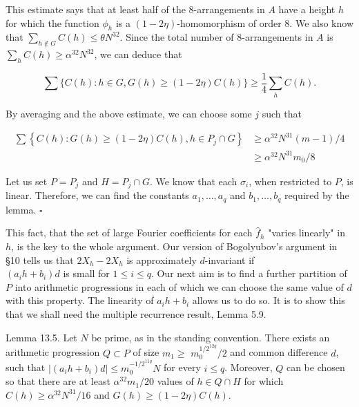 \documentclass[10pt]{article}
\begin{document}
This estimate says that at least half of the 8-arrangements in $A$ have a height $h$ for which the function $\phi_{h}$ is a $(1-2 \eta)$-homomorphism of order 8. We also know that $\sum_{h \notin G} C(h) \leqslant \theta N^{32}$. Since the total number of 8-arrangements in $A$ is $\sum_{h} C(h) \geqslant \alpha^{32} N^{32}$, we can deduce that

$$
\sum\{C(h): h \in G, G(h) \geqslant(1-2 \eta) C(h)\} \geqslant \frac{1}{4} \sum_{h} C(h) .
$$

By averaging and the above estimate, we can choose some $j$ such that

$$
\begin{aligned}
\sum\left\{C(h): G(h) \geqslant(1-2 \eta) C(h), h \in P_{j} \cap G\right\} & \geqslant \alpha^{32} N^{31}(m-1) / 4 \\
& \geqslant \alpha^{32} N^{31} m_{0} / 8
\end{aligned}
$$

Let us set $P=P_{j}$ and $H=P_{j} \cap G$. We know that each $\sigma_{i}$, when restricted to $P$, is linear. Therefore, we can find the constants $a_{1}, \ldots, a_{q}$ and $b_{1}, \ldots, b_{q}$ required by the lemma. \(\square\)

This fact, that the set of large Fourier coefficients for each $\hat{f}_{h}$ "varies linearly" in $h$, is the key to the whole argument. Our version of Bogolyubov's argument in §10 tells us that $2 X_{h}-2 X_{h}$ is approximately $d$-invariant if\\
$\left(a_{i} h+b_{i}\right) d$ is small for $1 \leqslant i \leqslant q$. Our next aim is to find a further partition of $P$ into arithmetic progressions in each of which we can choose the same value of $d$ with this property. The linearity of $a_{i} h+b_{i}$ allows us to do so. It is to show this that we shall need the multiple recurrence result, Lemma 5.9.

Lemma 13.5. Let $N$ be prime, as in the standing convention. There exists an arithmetic progression $Q \subset P$ of size $m_{1} \geqslant$ $m_{0}^{1 / 2^{12 q}} / 2$ and common difference $d$, such that $\left|\left(a_{i} h+b_{i}\right) d\right| \leqslant m_{0}^{-1 / 2^{11 q}} N$ for every $i \leqslant q$. Moreover, $Q$ can be chosen so that there are at least $\alpha^{32} m_{1} / 20$ values of $h \in Q \cap H$ for which $C(h) \geqslant \alpha^{32} N^{31} / 16$ and $G(h) \geqslant(1-2 \eta) C(h)$.
\end{document}
